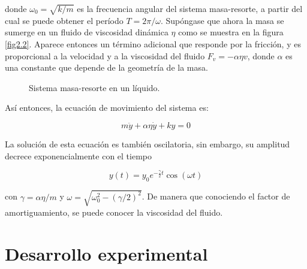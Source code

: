 \documentclass[final,5p,times,twocolumn, nopreprintline]{elsarticle}
\numberwithin{equation}{section}
\begin{document}
donde $\omega_0=\sqrt{k/m}$ es la frecuencia angular del sistema masa-resorte, a partir del cual se puede obtener el período $T=2\pi/\omega$. Supóngase que ahora la masa se sumerge en un fluido de viscosidad dinámica $\eta$ como se muestra en la figura \ref{fig2.2}. Aparece entonces un término adicional que responde por la fricción, y es proporcional a la velocidad y a la viscosidad del fluido $F_v=-\alpha\eta v$, donde $\alpha$ es una constante que depende de la geometría de la masa.

\begin{figure}
\begin{center}
\caption{Sistema masa-resorte en un líquido.}
\end{center}
\end{figure}\label{fig2.2}

Así entonces, la ecuación de movimiento del sistema es:

\begin{equation}
m\ddot{y}+\alpha\eta \dot{y}+ky=0
\end{equation}\label{eq2.4}

La solución de esta ecuación es también oscilatoria, sin embargo, su amplitud decrece exponencialmente con el tiempo

\begin{equation}
y(t)=y_0e^{-\frac{\gamma}{2}t}\cos(\omega t)
\end{equation}\label{eq2.5}

con $\gamma=\alpha\eta/m$ y $\omega=\sqrt{\omega_0^2-(\gamma/2)^2}$. De manera que conociendo el factor de amortiguamiento, se puede conocer la viscosidad del fluido.

\section{Desarrollo experimental}
\end{document}
